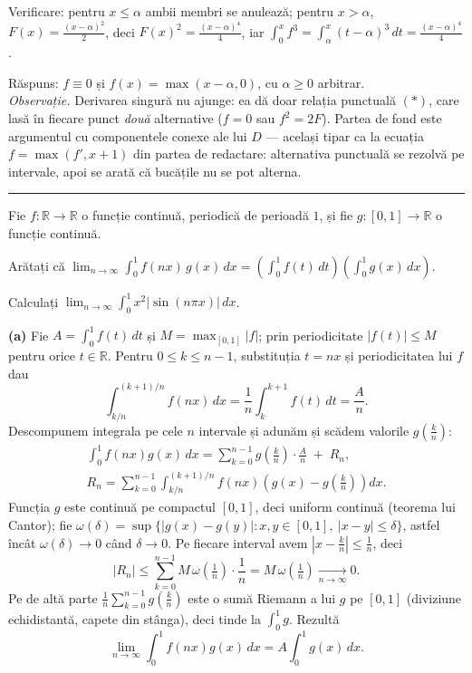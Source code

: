 Verificare: pentru $x\le\alpha$ ambii membri se anulează; pentru $x>\alpha$,
$F(x)=\frac{(x-\alpha)^2}{2}$, deci $F(x)^2=\frac{(x-\alpha)^4}{4}$, iar
$\int_0^x f^3 = \int_\alpha^x (t-\alpha)^3\,dt = \frac{(x-\alpha)^4}{4}$.

Răspuns: $f\equiv0$ și $f(x)=\max(x-\alpha,0)$, cu $\alpha\ge0$ arbitrar.\\[2pt]
\emph{Observație.} Derivarea singură nu ajunge: ea dă doar relația punctuală
$(\ast)$, care lasă în fiecare punct \emph{două} alternative ($f=0$ sau
$f^2=2F$). Partea de fond este argumentul cu componentele conexe ale lui $D$ ---
același tipar ca la ecuația $f=\max(f',x+1)$ din partea de redactare: alternativa
punctuală se rezolvă pe intervale, apoi se arată că bucățile nu se pot alterna.
\vspace{1mm}\hrule

Fie $f:\mathbb{R}\to\mathbb{R}$ o funcție continuă, periodică de perioadă $1$, și fie
$g:[0,1]\to\mathbb{R}$ o funcție continuă.
\begin{parti}
  \item Arătați că
        $\displaystyle\lim_{n\to\infty}\int_0^1 f(nx)\,g(x)\,dx
        = \left(\int_0^1 f(t)\,dt\right)\left(\int_0^1 g(x)\,dx\right)$.
  \item Calculați $\displaystyle\lim_{n\to\infty}\int_0^1 x^2\left|\sin(n\pi x)\right|\,dx$.
\end{parti}
\sol\noindent\textbf{(a)} Fie $A=\int_0^1 f(t)\,dt$ și $M=\max_{[0,1]}|f|$; prin
periodicitate $|f(t)|\le M$ pentru orice $t\in\mathbb{R}$. Pentru $0\le k\le n-1$,
substituția $t=nx$ și periodicitatea lui $f$ dau
\[ \int_{k/n}^{(k+1)/n} f(nx)\,dx = \frac1n\int_k^{k+1} f(t)\,dt = \frac{A}{n}. \]
Descompunem integrala pe cele $n$ intervale și adunăm și scădem valorile
$g\!\left(\frac kn\right)$:
\[ \begin{gathered} \int_0^1 f(nx)g(x)\,dx
= \sum_{k=0}^{n-1} g\!\left(\tfrac kn\right)\cdot\frac{A}{n} \;+\; R_n,\\
R_n = \sum_{k=0}^{n-1}\int_{k/n}^{(k+1)/n} f(nx)\left(g(x)-g\!\left(\tfrac kn\right)\right)dx . \end{gathered} \]
Funcția $g$ este continuă pe compactul $[0,1]$, deci uniform continuă (teorema lui
Cantor); fie $\omega(\delta)=\sup\{|g(x)-g(y)| : x,y\in[0,1],\ |x-y|\le\delta\}$,
astfel încât $\omega(\delta)\to0$ când $\delta\to0$. Pe fiecare interval avem
$\left|x-\frac kn\right|\le\frac1n$, deci
\[ |R_n| \le \sum_{k=0}^{n-1} M\,\omega\!\left(\tfrac1n\right)\cdot\frac1n
= M\,\omega\!\left(\tfrac1n\right) \xrightarrow[n\to\infty]{} 0 . \]
Pe de altă parte $\frac1n\sum_{k=0}^{n-1} g\!\left(\frac kn\right)$ este o sumă
Riemann a lui $g$ pe $[0,1]$ (diviziune echidistantă, capete din stânga), deci
tinde la $\int_0^1 g$. Rezultă
\[ \lim_{n\to\infty}\int_0^1 f(nx)g(x)\,dx = A\int_0^1 g(x)\,dx . \]


